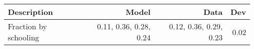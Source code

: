 \begin{tabular}{lrrr}
\hline
Description & Model  & Data  & Dev  \\ 
\hline
Fraction by schooling & 0.11, 0.36, 0.28, 0.24  & 0.12, 0.36, 0.29, 0.23  & 0.02  \\ 
\hline
\end{tabular}%
